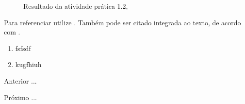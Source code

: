 \begin{figure}[H]
  \center
  \caption{Resultado da atividade prática 1.2, \cite{oliveira_SO2009}}\label{fig:ap1_cod_vigual1}
\end{figure}



Para referenciar utilize \cite{ninguem2022curioso}. Também pode ser citado integrada ao texto, de acordo com .




\begin{enumerate}[label=\Roman{*}, ref=(\roman{*})]
  \item fsfsdf
  \item kugfhiuh
\end{enumerate}

\begin{asparaenum}
\item Anterior ... \cite{ninguem2022curioso}
\item Próximo ... \label{pl1}
\end{asparaenum}


